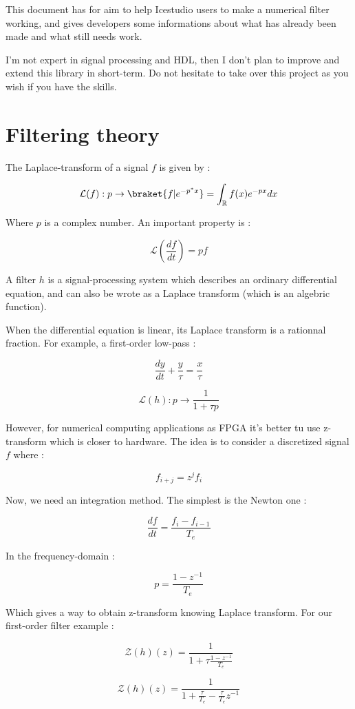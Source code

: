 \documentclass{report}
\begin{document}
This document has for aim to help Icestudio users to make a numerical filter working, and gives developers some informations about what has already been made and what still needs work.

I'm not expert in signal processing and HDL, then I don't plan to improve and extend this library in short-term. Do not hesitate to take over this project as you wish if you have the skills.

\section*{Filtering theory}

The Laplace-transform of a signal $f$ is given by :

\[
\mathcal{L}(f) : p \rightarrow \braket{f|e^{-p^*x}} = \int_\mathbb{R} f(x)e^{-p x} dx
\]

Where $p$ is a complex number. An important property is :

\[
\mathcal{L}\left(\frac{df}{dt} \right) = pf
\]

A filter $h$ is a signal-processing system which describes an ordinary differential equation, and can also be wrote as a Laplace transform (which is an algebric function).

When the differential equation is linear, its Laplace transform is a rationnal fraction. For example, a first-order low-pass :

\[
\frac{dy}{dt} + \frac{y}{\tau} = \frac{x}{\tau}
\]

\[
\mathcal{L}(h) : p \rightarrow \frac{1}{1 + \tau p}
\]

However, for numerical computing applications as FPGA it's better tu use z-transform which is closer to hardware. The idea is to consider a discretized signal $f$ where :

\[
f_{i+j} = z^j f_i
\]

Now, we need an integration method. The simplest is the Newton one :

\[
\frac{df}{dt} = \frac{f_i-f_{i-1}}{T_e}
\]

In the frequency-domain :

\[
p = \frac{1-z^{-1}}{T_e}
\]

Which gives a way to obtain z-transform knowing Laplace transform. For our first-order filter example :

\[
\mathcal{Z}(h)(z) = \frac{1}{1 + \tau \frac{1-z^{-1}}{T_e}}
\]

\[
\mathcal{Z}(h)(z) = \frac{1}{1+\frac{\tau}{T_e} - \frac{\tau}{T_e}z^{-1}}
\]
\end{document}
